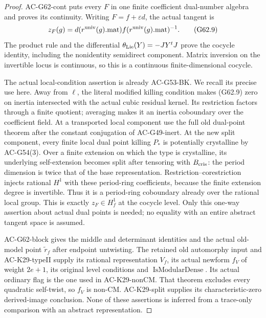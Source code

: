 \begin{proof}
AC-G62-cont puts every $F$ in one finite
coefficient dual-number algebra and proves its
continuity.  Writing $F=f+\varepsilon d$, the
actual tangent is
\[
 z_F(g)=d(r^{\rm univ}(g).\mathrm{mat})
                   f(r^{\rm univ}(g).\mathrm{mat})^{-1}.
                                                               \tag{G62.9}
\]
The product rule and the differential
$\theta_{\rm Lie}(Y)=-JY^tJ$ prove the cocycle
identity, including the nonidentity semidirect
component.  Matrix inversion on the invertible
locus is continuous, so this is a continuous
finite-dimensional cocycle.

The actual local-condition assertion is already
AC-G53-BK.  We recall its precise use here.
Away from $\ell$, the literal modified killing
condition makes (G62.9) zero on inertia intersected
with the actual cubic residual kernel.  Its
restriction factors through a finite quotient;
averaging makes it an inertia coboundary over
the coefficient field.  At a transported local
component use the full old dual-point theorem
after the constant conjugation of AC-G49-inert.
At the new split component, every finite local
dual point killing $P_*$ is potentially crystalline
by AC-G54(3).  Over a finite extension on which
the type is crystalline, its underlying
self-extension becomes split after tensoring
with $B_{\rm cris}$: the period dimension is
twice that of the base representation.
Restriction--corestriction injects rational
$H^1$ with these period-ring coefficients,
because the finite extension degree is invertible.
Thus it is a period-ring coboundary already over
the rational local group.  This is exactly
$z_F\in H_f^1$ at the cocycle level.
Only this one-way assertion about actual dual
points is needed; no equality with an entire
abstract tangent space is assumed.

AC-G62-block gives the middle and determinant
identities and the actual old-model point
$\widetilde r_f$ after endpoint untwisting.
The retained old automorphy input and
AC-K29-typeII supply its rational representation
$V_f$, its actual newform $f_V$ of weight
$2e+1$, its original level conditions and
$\operatorname{IsModularDense}$.
Its actual ordinary flag is the one used in
AC-K29-nonCM.  That theorem excludes every
quadratic self-twist, so $f_V$ is non-CM.
AC-K29-split supplies its characteristic-zero
derived-image conclusion.  None of these
assertions is inferred from a trace-only
comparison with an abstract representation.


\end{proof}
